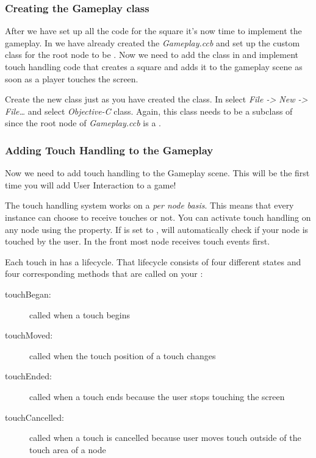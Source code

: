 \subsubsection{Creating the Gameplay class}

After we have set up all the code for the square it's now time to implement the
gameplay. In \SB{} we have already created the \ccbfile{} \textit{Gameplay.ccb}
and set up the custom class for the root node to be . Now we need to add the
 class in \xcode{} and implement touch handling code that
creates a square and adds it to the gameplay scene as soon as a player touches
the screen.

Create the new class just as you have created the  class. In
\xcode{} select \textit{File -> New -> File\ldots} and select
\textit{Objective-C} class. Again, this class needs to be a subclass of
\ccnode{} since the root node of \textit{Gameplay.ccb} is a \ccnode{}.

\subsubsection{Adding Touch Handling to the
Gameplay}\label{Introduction_FirstTouchHandling} Now we need to add touch
handling to the Gameplay scene. This will be the first time you will add User Interaction to a \cocos{} game! 

The \cocos{} touch handling system works on a \textit{per node
basis}.
This means that every \ccnode{} instance can choose to receive touches or not. You
can activate touch handling on any node using the
 property. If
 is set to , \cocos{} will
automatically check if your node is touched by the user. In \cocos{} the front
most node receives touch events first.

Each touch in \cocos{} has a lifecycle. That lifecycle consists of four
different states and four corresponding methods that are called on your
\ccnode{}:

\begin{description}
\item[touchBegan:] called when a touch begins
\item[touchMoved:] called when the touch position of a touch changes
\item[touchEnded:] called when a touch ends because the user stops touching the
screen
\item[touchCancelled:] called when a touch is cancelled because user moves touch
outside of the touch area of a node
\end{description}

